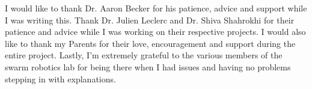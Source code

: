 

I would like to thank Dr. Aaron Becker for his patience, advice and support while I was writing this. Thank Dr. Julien Leclerc and Dr. Shiva Shahrokhi for their patience and advice while I was working on their respective projects. I would also like to thank my Parents for their love, encouragement and support during the entire project. Lastly, I’m extremely grateful to the various members of the swarm robotics lab for being there when I had issues and having no problems stepping in with explanations. 